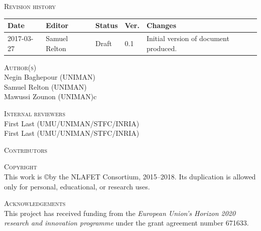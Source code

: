 \documentclass[a4paper,12pt]{article}
\begin{document}
\vspace{2em}




\noindent
\textsc{Revision history}\\[1em]
\begin{tabularx}{\linewidth}{@{}|l|l|l|l|X|}
  \hline
  \rowcolor{orange}
  \bf Date & \bf Editor & \bf Status & \bf Ver. & \bf Changes \\
  \hline
  2017-03-27 & Samuel Relton & Draft & 0.1 & Initial version of
                                             document produced. \\
  \hline
\end{tabularx}

\vspace{2em}




\noindent
\textsc{Author(s)}\\[1em]
Negin Baghepour (UNIMAN)\\
Samuel Relton (UNIMAN)\\
Mawussi Zounon (UNIMAN)c

\vspace{2em}

\noindent
\textsc{Internal reviewers}\\[1em]
First Last (UMU/UNIMAN/STFC/INRIA)\\
First Last (UMU/UNIMAN/STFC/INRIA)

\vspace{2em}






\noindent
\textsc{Contributors}\\[1em]

\vspace{2em}





\noindent
\textsc{Copyright}\\[1em]
This work is \copyright by the NLAFET Consortium, 2015--2018.
Its duplication is allowed only for personal, educational, or research uses.

\vspace{2em}





\noindent
\textsc{Acknowledgements}\\[1em]
This project has received funding from the \emph{European Union's Horizon 2020 research and innovation programme} under the grant agreement number 671633.
\end{document}
